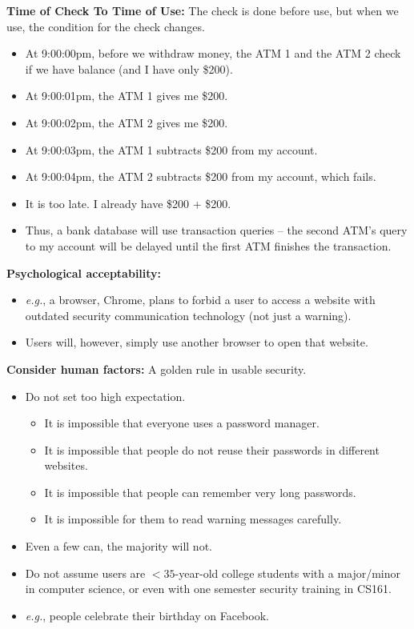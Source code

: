 \documentclass{article}
\newcommand{\parhead}[1]{\noindent \textbf{#1}}
\begin{document}
\newpage
\smallskip\parhead{Time of Check To Time of Use:} The check is done before use, but when we use, the condition for the check changes.
\begin{itemize}
    \item At 9:00:00pm, before we withdraw money, the ATM 1 and the ATM 2 check if we have balance (and I have only \$200).
    \item At 9:00:01pm, the ATM 1 gives me \$200.
    \item At 9:00:02pm, the ATM 2 gives me \$200.
    \item At 9:00:03pm, the ATM 1 subtracts \$200 from my account.
    \item At 9:00:04pm, the ATM 2 subtracts \$200 from my account, which fails.
    \item It is too late. I already have \$200 + \$200.
    \item Thus, a bank database will use transaction queries -- the second ATM's query to my account will be delayed until the first ATM finishes the transaction. 
\end{itemize}

\smallskip\parhead{Psychological acceptability:}
\begin{itemize}
    \item \emph{e.g.}, a browser, Chrome, plans to forbid a user to access a website with outdated security communication technology (not just a warning).
    
    \item Users will, however, simply use another browser to open that website.
\end{itemize}

\smallskip\parhead{Consider human factors:} A golden rule in usable security.
\begin{itemize}
    \item Do not set too high expectation.
    \begin{itemize}
        \item It is impossible that everyone uses a password manager.
        
        \item It is impossible that people do not reuse their passwords in different websites.
        
        \item It is impossible that people can remember very long passwords.
        
        \item It is impossible for them to read warning messages carefully.
    \end{itemize}
    
    \item Even a few can, the majority will not.
    
    \item Do not assume users are $<35$-year-old college students with a major/minor in computer science, or even with one semester security training in CS161.
    
    \item \emph{e.g.}, people celebrate their birthday on Facebook.
\end{itemize}
\end{document}
